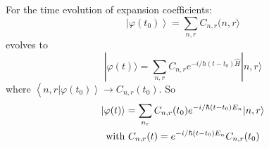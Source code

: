 \documentclass[12pt]{article}
\begin{document}
For the time evolution of expansion coefficients:
\begin{equation}
\left|\varphi\left(t_{0}\right)\right\rangle=\sum_{n, r} C_{n, r}(n, r\rangle
\end{equation}
evolves to
\begin{equation}
| \varphi(t)\rangle=\sum_{n, r}C_{n, r} e^{-i / \hbar\left(t-t_{0}\right) \hat{H}}|n, r\rangle
\end{equation}
where $\left\langle n, r\left|\varphi\left(t_{0}\right)\right\rangle \rightarrow C_{n, r}\left(t_{0}\right)\right.$. So
\begin{equation}
\begin{gathered}
\ket{\varphi(t)} = \sum_{n_r} C_{n, r}(t_0) e^{-i / \hbar\left(t-t_{0}\right)E_n}|n, r\rangle\\
\text{with } C_{n, r}(t) = e^{-i / \hbar\left(t-t_{0}\right)E_n} C_{n, r}(t_0)
\end{gathered}
\end{equation}
\end{document}
